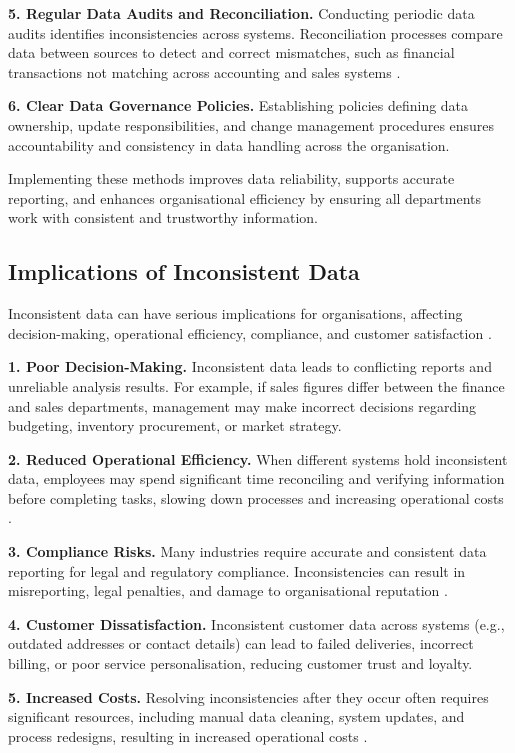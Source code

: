 \textbf{5. Regular Data Audits and Reconciliation.}  
Conducting periodic data audits identifies inconsistencies across systems. Reconciliation processes compare data between sources to detect and correct mismatches, such as financial transactions not matching across accounting and sales systems \cite{laurila1999data}.

\textbf{6. Clear Data Governance Policies.}  
Establishing policies defining data ownership, update responsibilities, and change management procedures ensures accountability and consistency in data handling across the organisation.

Implementing these methods improves data reliability, supports accurate reporting, and enhances organisational efficiency by ensuring all departments work with consistent and trustworthy information.

\subsection{Implications of Inconsistent Data}

Inconsistent data can have serious implications for organisations, affecting decision-making, operational efficiency, compliance, and customer satisfaction \cite{redman1996impact}.

\textbf{1. Poor Decision-Making.}  
Inconsistent data leads to conflicting reports and unreliable analysis results. For example, if sales figures differ between the finance and sales departments, management may make incorrect decisions regarding budgeting, inventory procurement, or market strategy.

\textbf{2. Reduced Operational Efficiency.}  
When different systems hold inconsistent data, employees may spend significant time reconciling and verifying information before completing tasks, slowing down processes and increasing operational costs \cite{madnick2009overview}.

\textbf{3. Compliance Risks.}  
Many industries require accurate and consistent data reporting for legal and regulatory compliance. Inconsistencies can result in misreporting, legal penalties, and damage to organisational reputation \cite{wang2006data}.

\textbf{4. Customer Dissatisfaction.}  
Inconsistent customer data across systems (e.g., outdated addresses or contact details) can lead to failed deliveries, incorrect billing, or poor service personalisation, reducing customer trust and loyalty.

\textbf{5. Increased Costs.}  
Resolving inconsistencies after they occur often requires significant resources, including manual data cleaning, system updates, and process redesigns, resulting in increased operational costs \cite{pipino2002dataquality}.


